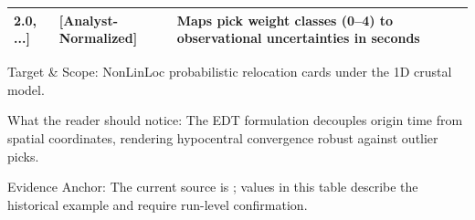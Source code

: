 \begin{landscape}
\begin{table}[htbp]
\begin{threeparttable}
\begin{tabularx}{\linewidth}{l l l c >{\raggedright\arraybackslash}X}
{        2.0, ...]} & [Analyst-Normalized] & Maps pick weight classes
        (0--4) to observational uncertainties in seconds \\
        \bottomrule
      \end{tabularx}
      \begin{tablenotes}[flushleft]
        \footnotesize
      \item Target \& Scope: \ac{NonLinLoc} probabilistic relocation cards
        under the 1D crustal model.
      \item What the reader should notice: The \ac{EDT} formulation
        decouples origin time from spatial coordinates, rendering
        hypocentral convergence robust against outlier picks.
      \item Evidence Anchor: The current source is
        ;
        values in this table describe the historical example and
        require run-level confirmation.
      \end{tablenotes}
    \end{threeparttable}
  \end{table}
\end{landscape}
